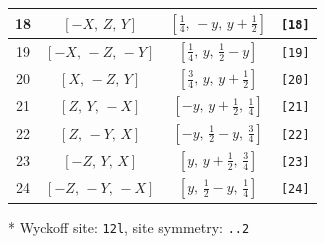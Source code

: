\documentclass[fleqn,8pt]{jsarticle}
\begin{document}
\begin{longtable}{cccc}
18 & $\left[ - X,\, Z,\, Y \right]$ & $\left[ \frac{1}{4},\, - y,\, y + \frac{1}{2} \right]$ & {\tt [18]} \\ \hline
19 & $\left[ - X,\, - Z,\, - Y \right]$ & $\left[ \frac{1}{4},\, y,\, \frac{1}{2} - y \right]$ & {\tt [19]} \\ \hline
20 & $\left[ X,\, - Z,\, Y \right]$ & $\left[ \frac{3}{4},\, y,\, y + \frac{1}{2} \right]$ & {\tt [20]} \\ \hline
21 & $\left[ Z,\, Y,\, - X \right]$ & $\left[ - y,\, y + \frac{1}{2},\, \frac{1}{4} \right]$ & {\tt [21]} \\ \hline
22 & $\left[ Z,\, - Y,\, X \right]$ & $\left[ - y,\, \frac{1}{2} - y,\, \frac{3}{4} \right]$ & {\tt [22]} \\ \hline
23 & $\left[ - Z,\, Y,\, X \right]$ & $\left[ y,\, y + \frac{1}{2},\, \frac{3}{4} \right]$ & {\tt [23]} \\ \hline
24 & $\left[ - Z,\, - Y,\, - X \right]$ & $\left[ y,\, \frac{1}{2} - y,\, \frac{1}{4} \right]$ & {\tt [24]} \\
\end{longtable}
* Wyckoff site: {\tt 12l}, site symmetry: {\tt ..2}
\renewcommand{\arraystretch}{1.2}
\end{document}
